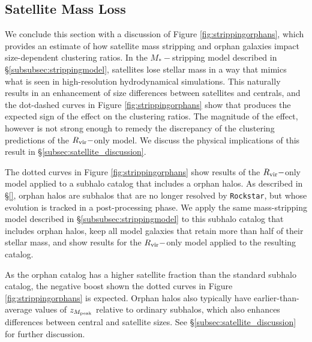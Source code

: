 \documentclass[usenatbib,usegraphicx,letterpaper]{mn2e}
\newcommand{\mstar}{M_{\ast}}
\newcommand{\zpeak}{z_{M_{\rm peak}}}
\newcommand{\rvir}{R_{\rm vir}}
\begin{document}
\subsection{Satellite Mass Loss}
\label{subsec:orphan_stripping}

We conclude this section with a discussion of Figure \ref{fig:strippingorphans}, which provides an estimate of how satellite mass stripping and orphan galaxies impact size-dependent clustering ratios. In the $\mstar-$stripping model described in \S\ref{subsubsec:strippingmodel}, satellites lose stellar mass in a way that mimics what is seen in high-resolution hydrodynamical simulations. This naturally results in an enhancement of size differences between satellites and centrals, and the dot-dashed curves in Figure \ref{fig:strippingorphans} show that produces the expected sign of the effect on the clustering ratios. The magnitude of the effect, however is not strong enough to remedy the discrepancy of the clustering predictions of the $\rvir-$only model. We discuss the physical implications of this result in \S\ref{subsec:satellite_discussion}.

The dotted curves in Figure \ref{fig:strippingorphans} show results of the $\rvir-$only model applied to a subhalo catalog that includes a orphan halos. As described in \S\ref{}, orphan halos are subhalos that are no longer resolved by {\tt Rockstar}, but whose evolution is tracked in a post-processing phase. We apply the same mass-stripping model described in \S\ref{subsubsec:strippingmodel} to this subhalo catalog that includes orphan halos, keep all model galaxies that retain more than half of their stellar mass, and show results for the $\rvir-$only model applied to the resulting catalog.

As the orphan catalog has a higher satellite fraction than the standard subhalo catalog, the negative boost shown the dotted curves in Figure \ref{fig:strippingorphans} is expected. Orphan halos also typically have earlier-than-average values of $\zpeak$ relative to ordinary subhalos, which also enhances differences between central and satellite sizes. See \S\ref{subsec:satellite_discussion} for further discussion.
\end{document}

